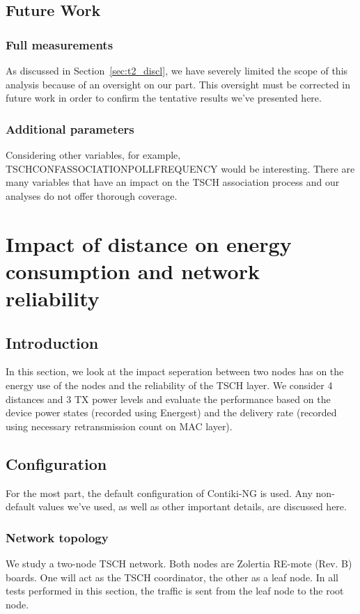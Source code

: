\documentclass[conference]{IEEEtran}
\newcommand{\secref}[1]{Section~\ref{#1}}
\renewcommand\_{\textunderscore\allowbreak}
\begin{document}
\subsection{Future Work}
\subsubsection{Full measurements} 
As discussed in \secref{sec:t2_discl}, we have severely limited the scope of this analysis because of an oversight on our part. This oversight must be corrected in future work in order to confirm the tentative results we've presented here. 
\subsubsection{Additional parameters}
Considering other variables, for example, TSCH\_CONF\_ASSOCIATION\_POLL\_FREQUENCY would be interesting. There are many variables that have an impact on the TSCH association process and our analyses do not offer thorough coverage. 

\section{Impact of distance on energy consumption and network reliability}
\label{section:task3}
\subsection{Introduction}

In this section, we look at the impact seperation between two nodes has on the energy use of the nodes and the reliability of the TSCH layer. We consider 4 distances and 3 TX power levels and evaluate the performance based on the device power states (recorded using Energest) and the delivery rate (recorded using necessary retransmission count on MAC layer). 

\subsection{Configuration} 
For the most part, the default configuration of Contiki-NG is used. Any non-default values we've used, as well as other important details, are discussed here.

\subsubsection{Network topology}
We study a two-node TSCH network. Both nodes are Zolertia RE-mote (Rev. B) boards. One will act as the TSCH coordinator, the other as a leaf node. In all tests performed in this section, the traffic is sent from the leaf node to the root node. 
\end{document}
